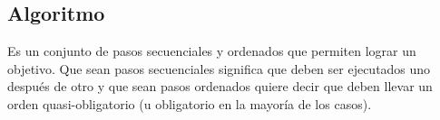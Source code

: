 \subsection{Algoritmo}
Es  un  conjunto  de  pasos  secuenciales  y  ordenados  que  permiten  lograr  un objetivo.    Que  sean  pasos  secuenciales  significa  que  deben  ser  ejecutados  uno  después  de  otro  y que  sean  pasos  ordenados  quiere  decir  que  deben  llevar  un  orden  quasi-obligatorio  (u  obligatorio en  la  mayoría  de  los  casos). 